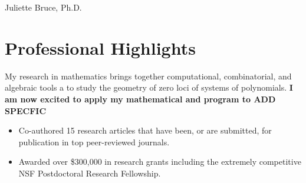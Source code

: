 \documentclass[
	10pt, %
]{FreemanCV}
\begin{document}
\begin{paracol}{2} %


\parbox[][0.11\textheight][c]{\linewidth}{ %
	\centering %
	
	{\sffamily\Huge Juliette Bruce, Ph.D.} %
	
	\medskip %
	
	
	\vfill %
}

\vspace{-.5cm}
\section{Professional Highlights}

My research in mathematics brings together computational, combinatorial, and algebraic tools a to study the geometry of zero loci of systems of polynomials. \textbf{I am now excited to apply my mathematical and program to ADD SPECFIC}
\begin{itemize}[leftmargin=*]
\item Co-authored 15 research articles that have been, or are submitted, for publication in top peer-reviewed journals. 
\item Awarded over \$300,000 in research grants including the extremely competitive NSF Postdoctoral Research Fellowship.%
\end{itemize}


\end{paracol}
\end{document}
